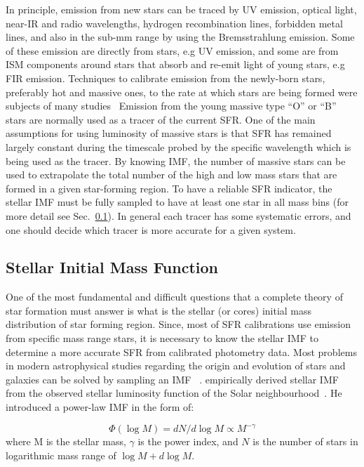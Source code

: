 In principle, emission from new stars can be traced by UV emission, optical light, near-IR and radio wavelengths, hydrogen recombination lines, forbidden metal lines, and also in the sub-mm range by using the Bremsstrahlung emission. 
Some of these emission are directly from stars, e.g UV emission, and some are from ISM components around stars that absorb and re-emit light of young stars, e.g FIR emission.
Techniques to calibrate emission from the newly-born stars, preferably hot and massive ones, to the rate at which stars are being formed were subjects of many studies~\citep[e.g.][]{Calzetti07, Kennicutt11, Hao11,Bigiel08} 
Emission from the young massive type ``O'' or ``B'' stars are normally used as a tracer of the current SFR.
One of the main assumptions for using luminosity of massive stars is that SFR has remained largely constant during the timescale probed by the specific wavelength which is being used as the tracer. 
By knowing IMF, the number of massive stars can be used to extrapolate the total number of the high and low mass stars that are formed in a given star-forming region.
To have a reliable SFR indicator, the stellar IMF must be fully sampled to have at least one star in all mass bins (for more detail see Sec.~\ref{sec: imf}).
In general each tracer has some systematic errors, and one should decide which tracer is more accurate for a given system. 

\subsection{Stellar Initial Mass Function}
\label{sec: imf}
One of the most fundamental and difficult questions that a complete theory of star formation must answer is what is the stellar (or cores) initial mass distribution of star forming region. 
Since, most of SFR calibrations use emission from specific mass range stars, it is necessary to know the stellar IMF to determine a more accurate SFR from calibrated photometry data. 
Most problems in modern astrophysical studies regarding the origin and evolution of stars and galaxies can be solved by sampling an IMF ~\citep{Bastin10}. 
\cite{Salpeter55} empirically derived stellar IMF from the observed stellar luminosity function of the Solar neighbourhood~\citep{Shu87}. 
He introduced a power-law IMF in the form of:

\begin{equation}
\label{equ: salp}
\Phi (\log M) = dN / d \log M \propto M^{-\gamma }
\end{equation} 
where M is the stellar mass, $\gamma$ is the power index, and $N$ is the number of stars in logarithmic mass range of $\log M + d\log M$. 

